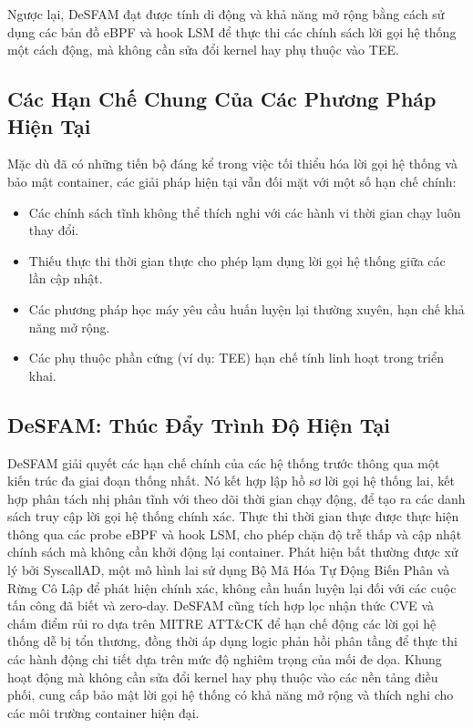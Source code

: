 Ngược lại, DeSFAM đạt được tính di động và khả năng mở rộng bằng cách sử dụng các bản đồ eBPF
và hook LSM để thực thi các chính sách lời gọi hệ thống một cách động, mà không cần sửa đổi
kernel hay phụ thuộc vào TEE.

\subsection{Các Hạn Chế Chung Của Các Phương Pháp Hiện Tại}
\label{subsec:common_limitations}

Mặc dù đã có những tiến bộ đáng kể trong việc tối thiểu hóa lời gọi hệ thống và bảo mật
container, các giải pháp hiện tại vẫn đối mặt với một số hạn chế chính:

\begin{itemize}
  \item Các chính sách tĩnh không thể thích nghi với các hành vi thời gian chạy luôn thay đổi.
  \item Thiếu thực thi thời gian thực cho phép lạm dụng lời gọi hệ thống giữa các lần cập nhật.
  \item Các phương pháp học máy yêu cầu huấn luyện lại thường xuyên, hạn chế khả năng mở rộng.
  \item Các phụ thuộc phần cứng (ví dụ: TEE) hạn chế tính linh hoạt trong triển khai.
\end{itemize}

\subsection{DeSFAM: Thúc Đẩy Trình Độ Hiện Tại}
\label{subsec:desfam_advancement}

DeSFAM giải quyết các hạn chế chính của các hệ thống trước thông qua một kiến trúc đa giai đoạn
thống nhất. Nó kết hợp lập hồ sơ lời gọi hệ thống lai, kết hợp phân tách nhị phân tĩnh với theo
dõi thời gian chạy động, để tạo ra các danh sách truy cập lời gọi hệ thống chính xác. Thực thi
thời gian thực được thực hiện thông qua các probe eBPF và hook LSM, cho phép chặn độ trễ thấp
và cập nhật chính sách mà không cần khởi động lại container. Phát hiện bất thường được xử lý
bởi SyscallAD, một mô hình lai sử dụng Bộ Mã Hóa Tự Động Biến Phân và Rừng Cô Lập để phát hiện
chính xác, không cần huấn luyện lại đối với các cuộc tấn công đã biết và zero-day. DeSFAM cũng
tích hợp lọc nhận thức CVE và chấm điểm rủi ro dựa trên MITRE ATT\&CK để hạn chế động các lời
gọi hệ thống dễ bị tổn thương, đồng thời áp dụng logic phản hồi phân tầng để thực thi các hành
động chi tiết dựa trên mức độ nghiêm trọng của mối đe dọa. Khung hoạt động mà không cần sửa đổi
kernel hay phụ thuộc vào các nền tảng điều phối, cung cấp bảo mật lời gọi hệ thống có khả năng
mở rộng và thích nghi cho các môi trường container hiện đại.
